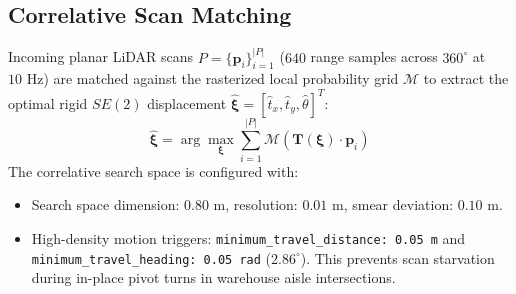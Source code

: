 \documentclass[10pt,a4paper]{article}
\begin{document}
\subsection{Correlative Scan Matching}
Incoming planar LiDAR scans $P = \{\mathbf{p}_i\}_{i=1}^{|P|}$ ($640$ range samples across $360^\circ$ at $10\text{ Hz}$) are matched against the rasterized local probability grid $\mathcal{M}$ to extract the optimal rigid $SE(2)$ displacement $\hat{\boldsymbol{\xi}} = [\hat{t}_x, \hat{t}_y, \hat{\theta}]^T$:
\begin{equation}
\hat{\boldsymbol{\xi}} = \arg\max_{\boldsymbol{\xi}} \sum_{i=1}^{|P|} \mathcal{M}\left(\mathbf{T}(\boldsymbol{\xi}) \cdot \mathbf{p}_i\right)
\end{equation}
The correlative search space is configured with:
\begin{itemize}
    \item Search space dimension: $0.80\text{ m}$, resolution: $0.01\text{ m}$, smear deviation: $0.10\text{ m}$.
    \item High-density motion triggers: \texttt{minimum\_travel\_distance: 0.05 m} and \texttt{minimum\_travel\_heading: 0.05 rad} ($2.86^\circ$). This prevents scan starvation during in-place pivot turns in warehouse aisle intersections.
\end{itemize}
\end{document}
